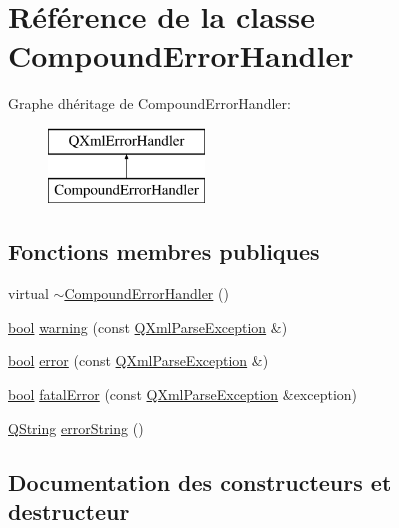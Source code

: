 \hypertarget{class_compound_error_handler}{}\section{Référence de la classe Compound\+Error\+Handler}
\label{class_compound_error_handler}
Graphe d\textquotesingle{}héritage de Compound\+Error\+Handler\+:\begin{figure}[H]
\begin{center}
\leavevmode
\includegraphics[height=2.000000cm]{class_compound_error_handler}
\end{center}
\end{figure}
\subsection*{Fonctions membres publiques}
\begin{DoxyCompactItemize}
\item 
virtual \hyperlink{class_compound_error_handler_a24c28bdf29baa390451a138cb835491e}{$\sim$\+Compound\+Error\+Handler} ()
\item 
\hyperlink{qglobal_8h_a1062901a7428fdd9c7f180f5e01ea056}{bool} \hyperlink{class_compound_error_handler_a80ccb953cac3ead66ae9c8892d8e3c03}{warning} (const \hyperlink{class_q_xml_parse_exception}{Q\+Xml\+Parse\+Exception} \&)
\item 
\hyperlink{qglobal_8h_a1062901a7428fdd9c7f180f5e01ea056}{bool} \hyperlink{class_compound_error_handler_a6b83c3c1e17622a7f33a977fc8f146c1}{error} (const \hyperlink{class_q_xml_parse_exception}{Q\+Xml\+Parse\+Exception} \&)
\item 
\hyperlink{qglobal_8h_a1062901a7428fdd9c7f180f5e01ea056}{bool} \hyperlink{class_compound_error_handler_a64adb9938c3f3e70a76cc4a224f0d093}{fatal\+Error} (const \hyperlink{class_q_xml_parse_exception}{Q\+Xml\+Parse\+Exception} \&exception)
\item 
\hyperlink{class_q_string}{Q\+String} \hyperlink{class_compound_error_handler_aceb61310e8c5649d6390a8dff0992caf}{error\+String} ()
\end{DoxyCompactItemize}


\subsection{Documentation des constructeurs et destructeur}
\hypertarget{class_compound_error_handler_a24c28bdf29baa390451a138cb835491e}{}
